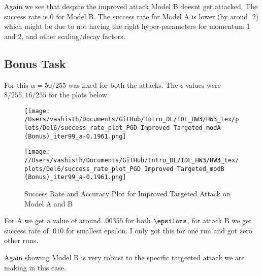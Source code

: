 \begin{solve}
Again we see that despite the improved attack Model B doesnt get attacked. The success rate is 0 for Model B. The success rate for Model A is lower (by aroud .2) which might be due to not having the right hyper-parameters for momentum 1 and 2, and other scaling/decay factors.

\end{solve}




\subsection{Bonus Task}


\begin{solve}
    For this $\alpha =  50/255$ was fixed for both the attacks. The $\epsilon$ values were $8/255, 16/255$ for the plots below.

\begin{figure}[H]
    \centering
    \texttt{[image: /Users/vashisth/Documents/GitHub/Intro\_DL/IDL\_HW3/HW3\_tex/plots/Del6/success\_rate\_plot\_PGD Improved Targeted\_modA (Bonus)\_iter99\_a-0.1961.png]}

    \centering
    \texttt{[image: //Users/vashisth/Documents/GitHub/Intro\_DL/IDL\_HW3/HW3\_tex/plots/Del6/success\_rate\_plot\_PGD Improved Targeted\_modB (Bonus)\_iter99\_a-0.1961.png]}

    \caption{Success Rate and Accuracy Plot for Improved Targeted Attack on Model A and B}
    \end{figure}

    For A we get a value of around $.00355$ for both $\epsilons$, for attack B we get success rate of $.010$ for smallest epsilon. I only got this for one run and got zero other runs. 

    Again showing Model B is very robust to the specific targeeted attack we are making in this case.
\end{solve}
